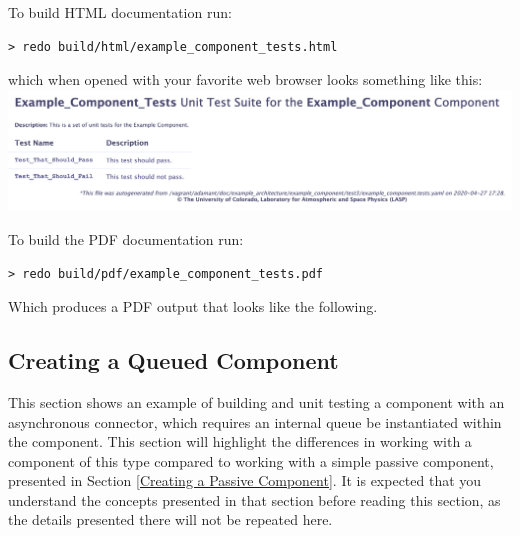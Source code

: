 To build HTML documentation run:

\vspace{5mm} %
\begin{verbatim}
> redo build/html/example_component_tests.html
\end{verbatim}
\vspace{5mm} %

which when opened with your favorite web browser looks something like this: \\

\vspace{5mm} %
\includegraphics[width=\textwidth]{images/ut_component_html.png}
\vspace{5mm} %

To build the PDF documentation run:

\vspace{5mm} %
\begin{verbatim}
> redo build/pdf/example_component_tests.pdf
\end{verbatim}
\vspace{5mm} %

Which produces a PDF output that looks like the following. \\

\noindent\makebox[\linewidth]{\rule{\textwidth}{0.4pt}}

\noindent\makebox[\linewidth]{\rule{\textwidth}{0.4pt}}

\subsection{Creating a Queued Component} \label{Creating a Queued Component}

This section shows an example of building and unit testing a component with an asynchronous connector, which requires an internal queue be instantiated within the component. This section will highlight the differences in working with a component of this type compared to working with a simple passive component, presented in Section \ref{Creating a Passive Component}. It is expected that you understand the concepts presented in that section before reading this section, as the details presented there will not be repeated here. \\


